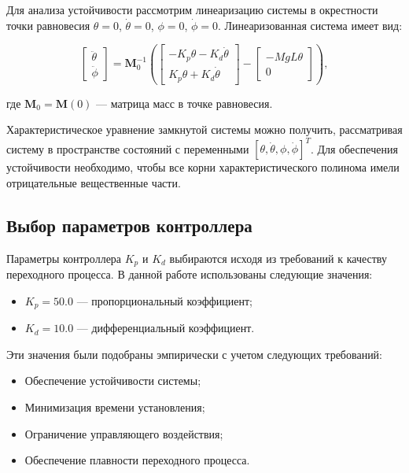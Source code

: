 Для анализа устойчивости рассмотрим линеаризацию системы в окрестности точки равновесия $\theta = 0$, $\dot{\theta} = 0$, $\phi = 0$, $\dot{\phi} = 0$. Линеаризованная система имеет вид:

\[
\begin{bmatrix} \ddot{\theta} \\ \ddot{\phi} \end{bmatrix} = \mathbf{M}_0^{-1} \left( \begin{bmatrix} -K_p \theta - K_d \dot{\theta} \\ K_p \theta + K_d \dot{\theta} \end{bmatrix} - \begin{bmatrix} -M g L \theta \\ 0 \end{bmatrix} \right),
\]

где $\mathbf{M}_0 = \mathbf{M}(0)$ --- матрица масс в точке равновесия.

Характеристическое уравнение замкнутой системы можно получить, рассматривая систему в пространстве состояний с переменными $[\theta, \dot{\theta}, \phi, \dot{\phi}]^T$. Для обеспечения устойчивости необходимо, чтобы все корни характеристического полинома имели отрицательные вещественные части.

\subsection{Выбор параметров контроллера}

Параметры контроллера $K_p$ и $K_d$ выбираются исходя из требований к качеству переходного процесса. В данной работе использованы следующие значения:
\begin{itemize}
    \item $K_p = 50.0$ --- пропорциональный коэффициент;
    \item $K_d = 10.0$ --- дифференциальный коэффициент.
\end{itemize}

Эти значения были подобраны эмпирически с учетом следующих требований:
\begin{itemize}
    \item Обеспечение устойчивости системы;
    \item Минимизация времени установления;
    \item Ограничение управляющего воздействия;
    \item Обеспечение плавности переходного процесса.
\end{itemize}

